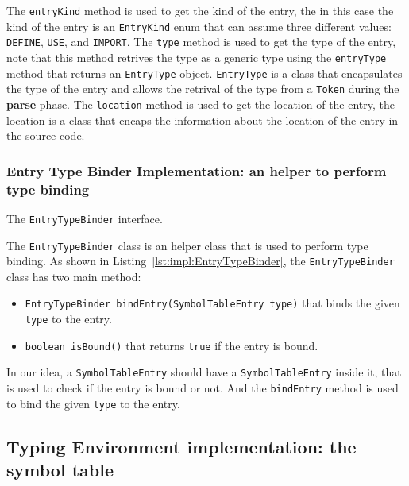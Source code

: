 The \texttt{entryKind} method is used to get the kind of the entry, the in this case the kind of the entry is an \texttt{EntryKind} enum that can assume three different values: \texttt{DEFINE}, \texttt{USE}, and \texttt{IMPORT}. The \texttt{type} method is used to get the type of the entry, note that this method retrives the type as a generic type using the \texttt{entryType} method that returns an \texttt{EntryType} object. \texttt{EntryType} is a class that encapsulates the type of the entry and allows the retrival of the type from a \texttt{Token} during the \textbf{parse} phase.
The \texttt{location} method is used to get the location of the entry, the location is a class that encaps the information about the location of the entry in the source code.


\subsubsection{Entry Type Binder Implementation: an helper to perform type binding}\label{subsec:impl:EntryTypeBinder}

\begin{Listing}[tbh]
    \centering
    \caption{The \texttt{EntryTypeBinder} interface.}
    \label{lst:impl:EntryTypeBinder}
\end{Listing}

The \texttt{EntryTypeBinder} class is an helper class that is used to perform type binding. As shown in Listing~\ref{lst:impl:EntryTypeBinder}, the \texttt{EntryTypeBinder} class has two main method:
\begin{itemize}
    \item \texttt{EntryTypeBinder bindEntry(SymbolTableEntry type)} that binds the given \texttt{type} to the entry.
    \item \texttt{boolean isBound()} that returns \texttt{true} if the entry is bound.
\end{itemize}

In our idea, a \texttt{SymbolTableEntry} should have a \texttt{SymbolTableEntry} inside it, that is used to check if the entry is bound or not. And the \texttt{bindEntry} method is used to bind the given \texttt{type} to the entry.

\subsection{Typing Environment implementation: the symbol table}\label{subsec:impl:TypingEnvironment}


